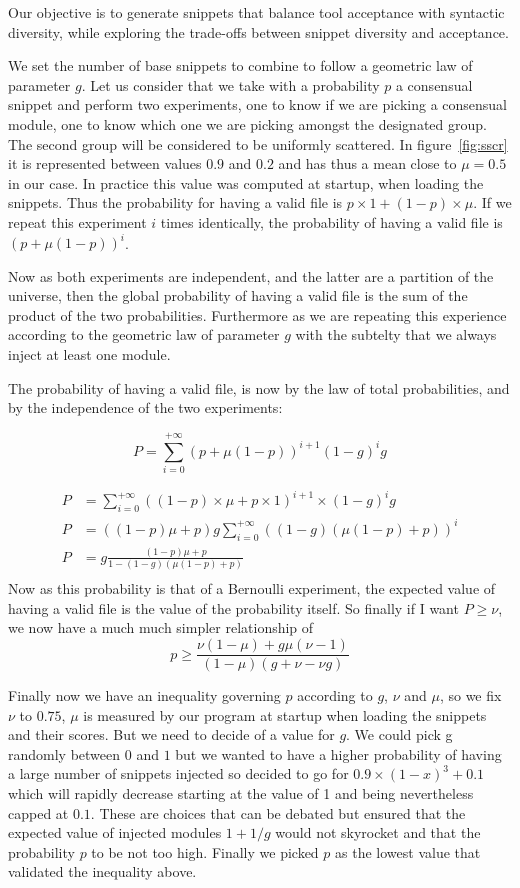 Our objective is to generate snippets that balance tool acceptance with syntactic diversity, while exploring the trade-offs between snippet diversity and acceptance.

We set the number of base snippets to combine to follow a geometric law of parameter \(g\).
Let us consider that we take with a probability \(p\) a consensual snippet and perform
two experiments, one to know if we are picking a consensual module, one to
know which one we are picking amongst the designated group.
The second
group will be considered to be uniformly scattered. In figure~\ref{fig:sscr} it is represented between values \(0.9\) and \(0.2\) and has
thus a mean close to \(\mu=0.5\) in our case. In practice this value was computed at startup, when loading the snippets.
Thus the probability for
having a valid file is \(p \times 1 + (1-p) \times \mu\).
If we repeat
this experiment \(i\) times identically, the probability of having a
valid file is \((p + \mu (1-p))^i\).

Now as both experiments are independent, and the latter are a partition of the universe,
then the global probability of having a valid file is the sum of the product of the two probabilities.
Furthermore as we are repeating this experience
according to the geometric law of parameter \(g\) with the subtelty that
we always inject at least one module.

The probability of having a valid file, is now by the law of total probabilities, and by the independence of the two experiments:

\[
    P = \sum_{i=0}^{+\infty} (p + \mu (1-p))^{i+1} (1-g)^{i} g
\]


\begin{align*}
    P & = \sum_{i = 0}^{+\infty} ((1-p) \times \mu + p \times 1)^{i+1}\times (1-g)^ig \\
    P & = ((1-p) \mu + p )g \sum_{i = 0}^{+\infty} ((1-g)(\mu (1-p) + p ))^{i}        \\
    P & = g \frac {(1-p) \mu + p }{1 - (1-g)(\mu (1-p) + p)}                          \\
\end{align*}
Now as this probability is that of a Bernoulli experiment, the expected value of having a valid file is
the value of the probability itself.
So finally if I want \(P \geq \nu\), we now have a much much simpler
relationship of
\[ p \geq \frac {\nu(1-\mu) + g \mu (\nu - 1)}{(1 - \mu)(g + \nu - \nu g)}\]

Finally now we have an inequality governing \(p\) according to \(g\),
\(\nu\) and \(\mu\), so we fix \(\nu\) to \(0.75\), \(\mu\) is measured
by our program at startup when loading the snippets and their scores.
But we need to decide of a value for \(g\).
We could pick g randomly
between \(0\) and \(1\) but we wanted to have a higher probability of
having a large number of snippets injected so decided to go for
\(0.9 \times (1-x)^3 + 0.1\) which will rapidly decrease starting at the
value of 1 and being nevertheless capped at \(0.1\).
These are choices
that can be debated but ensured that the expected value of injected
modules \(1 + 1/g\) would not skyrocket and that the probability \(p\)
to be not too high.
Finally we picked \(p\) as the lowest value that
validated the inequality above.
